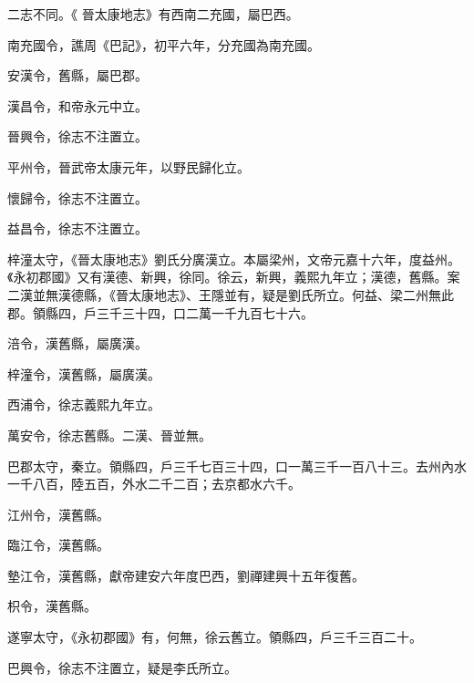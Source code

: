 \begin{pinyinscope}
 二志不同。《
 晉太康地志》有西南二充國，屬巴西。



 南充國令，譙周《巴記》，初平六年，分充國為南充國。



 安漢令，舊縣，屬巴郡。



 漢昌令，和帝永元中立。



 晉興令，徐志不注置立。



 平州令，晉武帝太康元年，以野民歸化立。



 懷歸令，徐志不注置立。



 益昌令，徐志不注置立。



 梓潼太守，《晉太康地志》劉氏分廣漢立。本屬梁州，文帝元嘉十六年，度益州。《永初郡國》又有漢德、新興，徐同。徐云，新興，義熙九年立；漢德，舊縣。案二漢並無漢德縣，《晉太康地志》、王隱並有，疑是劉氏所立。何益、梁二州無此郡。領縣四，戶三千三十四，口二萬一千九百七十六。



 涪令，漢舊縣，屬廣漢。



 梓潼令，漢舊縣，屬廣漢。



 西浦令，徐志義熙九年立。



 萬安令，徐志舊縣。二漢、晉並無。



 巴郡太守，秦立。領縣四，戶三千七百三十四，口一萬三千一百八十三。去州內水一千八百，陸五百，外水二千二百；去京都水六千。



 江州令，漢舊縣。



 臨江令，漢舊縣。



 墊江令，漢舊縣，獻帝建安六年度巴西，劉禪建興十五年復舊。



 枳令，漢舊縣。



 遂寧太守，《永初郡國》有，何無，徐云舊立。領縣四，戶三千三百二十。



 巴興令，徐志不注置立，疑是李氏所立。




\end{pinyinscope}
